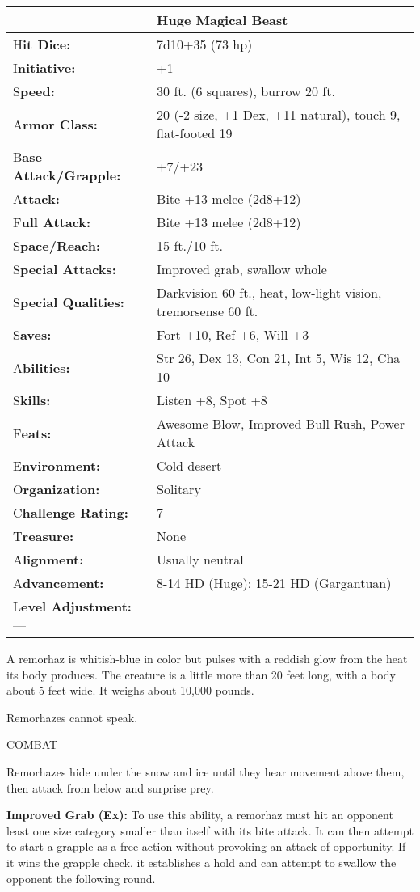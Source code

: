 \documentclass{article}
\begin{document}
\begin{tabular}{|>{\raggedright}p{91pt}|>{\raggedright}p{234pt}|}
\hline
  & Huge Magical Beast\tabularnewline
\hline
H\textbf{it Dice:} & 7d10+35 (73 hp)\tabularnewline
\hline
I\textbf{nitiative:} & +1\tabularnewline
\hline
S\textbf{peed:} & 30 ft. (6 squares), burrow 20 ft.\tabularnewline
\hline
A\textbf{rmor Class:} & 20 (-2 size, +1 Dex, +11 natural), touch 9, flat-footed 
19\tabularnewline
\hline
B\textbf{ase Attack/Grapple:} & +7/+23\tabularnewline
\hline
A\textbf{ttack:} & Bite +13 melee (2d8+12)\tabularnewline
\hline
F\textbf{ull Attack:} & Bite +13 melee (2d8+12)\tabularnewline
\hline
S\textbf{pace/Reach:} & 15 ft./10 ft.\tabularnewline
\hline
S\textbf{pecial Attacks:} & Improved grab, swallow whole\tabularnewline
\hline
S\textbf{pecial Qualities:} & Darkvision 60 ft., heat, low-light vision, tremorsense 
60 ft.\tabularnewline
\hline
S\textbf{aves:} & Fort +10, Ref +6, Will +3\tabularnewline
\hline
A\textbf{bilities:} & Str 26, Dex 13, Con 21, Int 5, Wis 12, Cha 10\tabularnewline
\hline
S\textbf{kills:} & Listen +8, Spot +8\tabularnewline
\hline
F\textbf{eats:} & Awesome Blow, Improved Bull Rush, Power Attack\tabularnewline
\hline
E\textbf{nvironment:} & Cold desert\tabularnewline
\hline
O\textbf{rganization:} & Solitary\tabularnewline
\hline
C\textbf{hallenge Rating:} & 7\tabularnewline
\hline
T\textbf{reasure:} & None\tabularnewline
\hline
A\textbf{lignment:} & Usually neutral\tabularnewline
\hline
A\textbf{dvancement:} & 8-14 HD (Huge); 15-21 HD (Gargantuan)\tabularnewline
\hline
L\textbf{evel Adjustment:}--- & \tabularnewline
\hline
\end{tabular}

A remorhaz is whitish-blue in color but pulses with a reddish glow from the heat 
its body produces. The creature is a little more than 20 feet long, with a body 
about 5 feet wide. It weighs about 10,000 pounds.

Remorhazes cannot speak.

COMBAT

Remorhazes hide under the snow and ice until they hear movement above them, then 
attack from below and surprise prey.

\textbf{Improved Grab (Ex): }To use this ability, a remorhaz must hit an opponent 
least one size category smaller than itself with its bite attack. It can then attempt 
to start a grapple as a free action without provoking an attack of opportunity. 
If it wins the grapple check, it establishes a hold and can attempt to swallow 
the opponent the following round.
\end{document}
